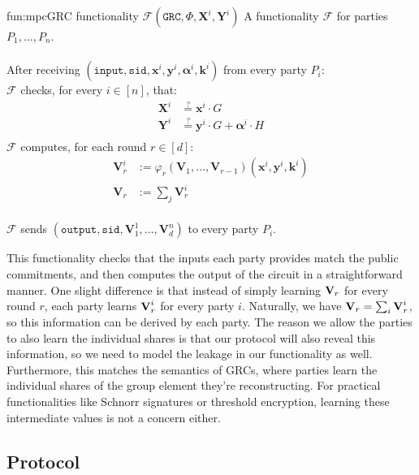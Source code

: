 \begin{afunctionality}{fun:mpc}{GRC functionality $\mathcal{F}(\texttt{GRC}, \Phi, \textbf{X}^i, \textbf{Y}^i)$}
A functionality $\mathcal{F}$ for parties $P_1, \ldots, P_n$.\\
\\
After receiving
$(\texttt{input}, \texttt{sid}, \textbf{x}^i, \textbf{y}^i, \boldsymbol{\alpha}^i, \textbf{k}^i)$ from every party $P_i$:\\
$\mathcal{F}$ checks, for every $i \in [n]$, that:
$$
\begin{aligned}
    \textbf{X}^i &\stackrel{?}{=} \textbf{x}^i \cdot G\\
    \textbf{Y}^i &\stackrel{?}{=} \textbf{y}^i \cdot G + \boldsymbol{\alpha}^i \cdot H\\
\end{aligned}
$$
$\mathcal{F}$ computes, for each round $r \in [d]$:
$$
\begin{aligned}
    \textbf{V}^i_{r} &:= \varphi_{r}(\textbf{V}_{1}, \ldots, \textbf{V}_{r - 1})(
        \textbf{x}^i, \textbf{y}^i, \textbf{k}^i
    )\\
    \textbf{V}_r &:= \sum_j \textbf{V}^i_r
\end{aligned}
$$\\
$\mathcal{F}$ sends $(\texttt{output}, \texttt{sid}, \textbf{V}^1_1, \ldots, \textbf{V}^n_d)$ to every party $P_i$.
\end{afunctionality}

This functionality checks that the inputs each party provides match
the public commitments, and then computes the output of the circuit
in a straightforward manner.
One slight difference is that instead of simply learning $\textbf{V}_r$ for
every round $r$, each party learns $\textbf{V}^i_r$ for every party $i$.
Naturally, we have $\textbf{V}_r = \sum_i \textbf{V}^i_r$, so this information
can be derived by each party.
The reason we allow the parties to also learn the individual shares
is that our protocol will also reveal this
information, so we need to model the leakage in our functionality as well.
Furthermore, this matches the semantics of GRCs,
where parties learn the individual shares of the group element they're
reconstructing.
For practical functionalities like Schnorr signatures or threshold encryption,
learning these intermediate values is not a concern either.

\subsection{Protocol}

